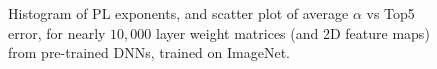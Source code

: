 \begin{figure}[H]
   \centering
   \quad
   \vspace{-5mm}
   \caption{Histogram of PL exponents, and scatter plot of average ${\alpha}$ vs Top5 error, for nearly $10,000$ layer weight matrices (and 2D feature maps) from pre-trained DNNs, trained on ImageNet.
   }
   \label{fig:alphas}
\end{figure}

